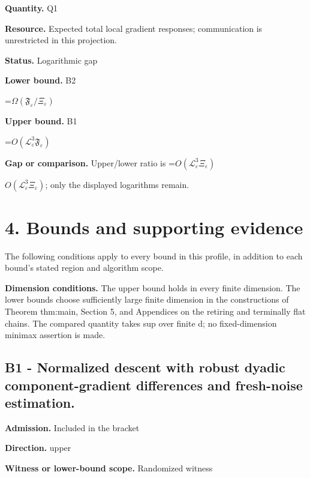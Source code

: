 \documentclass[10pt,a4paper]{article}
\newcommand{\AtlasMath}[1]{\par\begingroup\centering\setbox0=\hbox{$\displaystyle #1$}\ifdim\wd0>1.4\linewidth\typeout{ATLAS WIDE FORMULA: \the\wd0}\fi\ifdim\wd0>\linewidth\resizebox{\linewidth}{!}{\box0}\else\box0\fi\par\endgroup}
\newcommand{\AtlasInlineMath}[1]{\begingroup\setbox0=\hbox{$#1$}\ifdim\wd0>.4\linewidth\endgroup\AtlasMath{#1}\else\endgroup$#1$\fi}
\begin{document}
\textbf{Quantity.} Q1



\textbf{Resource.} Expected total local gradient responses; communication is unrestricted in this projection.



\textbf{Status.} Logarithmic gap



\textbf{Lower bound.} B2



\AtlasMath{\Omega(\mathfrak F_\varepsilon/\Xi_\varepsilon)}


\textbf{Upper bound.} B1



\AtlasMath{O(\mathcal L_\varepsilon^3\mathfrak F_\varepsilon)}


\textbf{Gap or comparison.} Upper/lower ratio is \AtlasInlineMath{O(\mathcal L_\varepsilon^3\Xi_\varepsilon)}; only the displayed logarithms remain.



\section{4. Bounds and supporting evidence}


The following conditions apply to every bound in this profile, in addition to each bound's stated region and algorithm scope.



\textbf{Dimension conditions.} The upper bound holds in every finite dimension. The lower bounds choose sufficiently large finite dimension in the constructions of Theorem thm:main, Section 5, and Appendices on the retiring and terminally flat chains. The compared quantity takes sup over finite d; no fixed-dimension minimax assertion is made.



\subsection{B1 - Normalized descent with robust dyadic component-gradient differences and fresh-noise estimation.}


\textbf{Admission.} Included in the bracket



\textbf{Direction.} upper



\textbf{Witness or lower-bound scope.} Randomized witness
\end{document}
